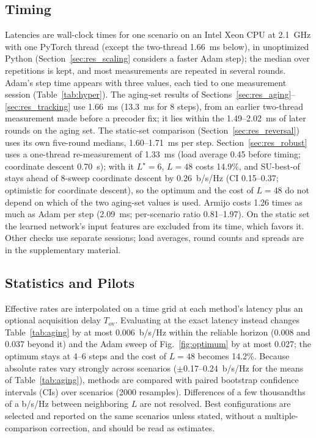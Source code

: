 \subsection{Timing}
Latencies are wall-clock times for one scenario on an Intel Xeon CPU at 2.1~GHz with one PyTorch thread (except the two-thread 1.66~ms below), in unoptimized Python (Section~\ref{sec:res_scaling} considers a faster Adam step); the median over repetitions is kept, and most measurements are repeated in several rounds. Adam's step time appears with three values, each tied to one measurement session (Table~\ref{tab:hyper}). The aging-set results of Sections~\ref{sec:res_aging}--\ref{sec:res_tracking} use 1.66~ms (13.3~ms for 8 steps), from an earlier two-thread measurement made before a precoder fix; it lies within the 1.49--2.02~ms of later rounds on the aging set. The static-set comparison (Section~\ref{sec:res_reversal}) uses its own five-round medians, 1.60--1.71~ms per step. Section~\ref{sec:res_robust} uses a one-thread re-measurement of 1.33~ms (load average 0.45 before timing; coordinate descent 0.70~s); with it $L^\star=6$, $L=48$ costs 14.9\%, and SU-best-of stays ahead of 8-sweep coordinate descent by 0.26~b/s/Hz (CI 0.15--0.37; optimistic for coordinate descent), so the optimum and the cost of $L=48$ do not depend on which of the two aging-set values is used. Armijo costs 1.26 times as much as Adam per step (2.09~ms; per-scenario ratio 0.81--1.97). On the static set the learned network's input features are excluded from its time, which favors it. Other checks use separate sessions; load averages, round counts and spreads are in the supplementary material.

\subsection{Statistics and Pilots}
Effective rates are interpolated on a time grid at each method's latency plus an optional acquisition delay $T_{\mathrm{ov}}$. Evaluating at the exact latency instead changes Table~\ref{tab:aging} by at most 0.006~b/s/Hz within the reliable horizon (0.008 and 0.037 beyond it) and the Adam sweep of Fig.~\ref{fig:optimum} by at most 0.027; the optimum stays at 4--6 steps and the cost of $L=48$ becomes 14.2\%. Because absolute rates vary strongly across scenarios ($\pm$0.17--0.24~b/s/Hz for the means of Table~\ref{tab:aging}), methods are compared with paired bootstrap confidence intervals (CIs) over scenarios (2000 resamples). Differences of a few thousandths of a b/s/Hz between neighboring $L$ are not resolved. Best configurations are selected and reported on the same scenarios unless stated, without a multiple-comparison correction, and should be read as estimates.

